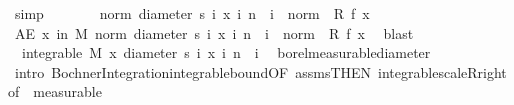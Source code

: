 \begin{isabellebody}
\ simp\isanewline
\ \ \ \ \isamarkupfalse%
\ \isamarkupfalse%
\ {\isachardoublequoteopen}norm\ {\isacharparenleft}{\kern0pt}diameter\ {\isacharbraceleft}{\kern0pt}s\ i\ x\ {\isacharbar}{\kern0pt}i{\isachardot}{\kern0pt}\ n\ {\isasymle}\ i{\isacharbraceright}{\kern0pt}{\isacharparenright}{\kern0pt}\ {\isasymle}\ norm\ {\isacharparenleft}{\kern0pt}{}\ {\isacharasterisk}{\kern0pt}\isactrlsub R\ f\ x{\isacharparenright}{\kern0pt}{\isachardoublequoteclose}\ \isamarkupfalse%
\ {\isacharasterisk}{\kern0pt}\ \isacommand{{\isachardot}{\kern0pt}}\isamarkupfalse%
\isanewline
\ \ \isacommand{{\isacharbraceright}{\kern0pt}}\isamarkupfalse%
\isanewline
\ \ \isamarkupfalse%
\ {\isachardoublequoteopen}AE\ x\ in\ M{\isachardot}{\kern0pt}\ norm\ {\isacharparenleft}{\kern0pt}diameter\ {\isacharbraceleft}{\kern0pt}s\ i\ x\ {\isacharbar}{\kern0pt}i{\isachardot}{\kern0pt}\ n\ {\isasymle}\ i{\isacharbraceright}{\kern0pt}{\isacharparenright}{\kern0pt}\ {\isasymle}\ norm\ {\isacharparenleft}{\kern0pt}{}\ {\isacharasterisk}{\kern0pt}\isactrlsub R\ f\ x{\isacharparenright}{\kern0pt}{\isachardoublequoteclose}\ \isamarkupfalse%
\ blast\isanewline
\ \ \isamarkupfalse%
\ \ {\isachardoublequoteopen}integrable\ M\ {\isacharparenleft}{\kern0pt}{\isasymlambda}x{\isachardot}{\kern0pt}\ diameter\ {\isacharbraceleft}{\kern0pt}s\ i\ x\ {\isacharbar}{\kern0pt}i{\isachardot}{\kern0pt}\ n\ {\isasymle}\ i{\isacharbraceright}{\kern0pt}{\isacharparenright}{\kern0pt}{\isachardoublequoteclose}\ \isamarkupfalse%
\ borel{\isacharunderscore}{\kern0pt}measurable{\isacharunderscore}{\kern0pt}diameter\ \isamarkupfalse%
\ {\isacharparenleft}{\kern0pt}intro\ Bochner{\isacharunderscore}{\kern0pt}Integration{\isachardot}{\kern0pt}integrable{\isacharunderscore}{\kern0pt}bound{\isacharbrackleft}{\kern0pt}OF\ assms{\isacharparenleft}{\kern0pt}{}{\isacharparenright}{\kern0pt}{\isacharbrackleft}{\kern0pt}THEN\ integrable{\isacharunderscore}{\kern0pt}scaleR{\isacharunderscore}{\kern0pt}right{\isacharbrackleft}{\kern0pt}of\ {}{\isacharbrackright}{\kern0pt}{\isacharbrackright}{\kern0pt}{\isacharbrackright}{\kern0pt}{\isacharcomma}{\kern0pt}\ measurable{\isacharparenright}{\kern0pt}\isanewline
{}\isamarkupfalse%
%
\endisatagproof
{\isafoldproof}%
%
\isadelimproof
\isanewline
%
\endisadelimproof
{}\isamarkupfalse%
%
\isadelimdocument
%
\endisadelimdocument
%
\isatagdocument
%
\end{isabellebody}
